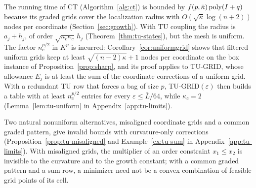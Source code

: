 The running time of CT (Algorithm~\ref{alg:ct}) is bounded by
$f(p,\bar\kappa)\operatorname{poly}(I+q)$ because its graded grids cover the localization
radius with $O(\sqrt{\bar\kappa}\log(n+2))$ nodes per coordinate
(Section~\ref{sec:growth}). With TU coupling the radius is
$a_j+h_j$, of order $\sqrt{n_c\kappa_c}\,h_j$ (Theorem~\ref{thm:tu-states}),
but the mesh is uniform. The factor $n_c^{p/2}$ in $K^p$ is incurred:
Corollary~\ref{cor:uniformgrid} shows that filtered uniform grids keep at
least $\sqrt{(n-2)\kappa}+1$ nodes per coordinate on the box instance of
Proposition~\ref{prop:sharp}, and its proof applies to TU-GRID, whose
allowance $E_j$ is at least the sum of the coordinate corrections of a
uniform grid. With a redundant TU row that forces a bag of size $p$,
TU-GRID$(\varepsilon)$ then builds a table with at least $n_c^{p/2}$ entries
for every $\varepsilon\le\bar L/64$, while $\kappa_c=2$
(Lemma~\ref{lem:tu-uniform} in Appendix~\ref{app:tu-limits}).

Two natural nonuniform alternatives, misaligned coordinate grids and a
common graded pattern, give invalid bounds with curvature-only corrections
(Proposition~\ref{prop:tu-misaligned} and Example~\ref{ex:tu-sum} in
Appendix~\ref{app:tu-limits}). With misaligned grids, the multiplier of an
order constraint $x_1\le x_2$ is invisible to the curvature and to the growth
constant; with a common graded pattern and a sum row, a minimizer need not be
a convex combination of feasible grid points of its cell.

